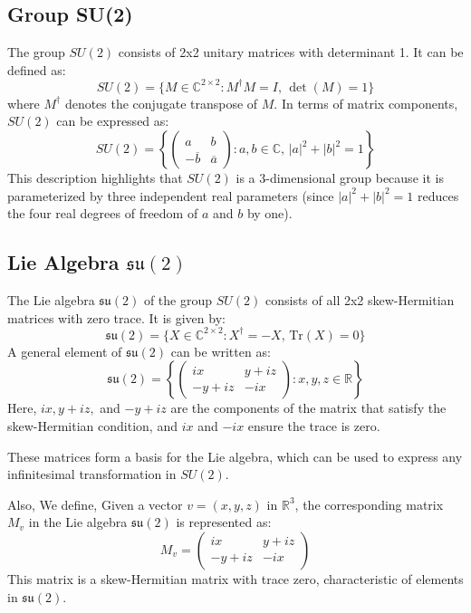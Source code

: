 \documentclass{article}
\begin{document}
\subsection*{Group SU(2)}
The group \( SU(2) \) consists of 2x2 unitary matrices with determinant 1. It can be defined as:
\[
SU(2) = \{ M \in \mathbb{C}^{2 \times 2} : M^\dagger M = I, \, \det(M) = 1 \}
\]
where \( M^\dagger \) denotes the conjugate transpose of \( M \). In terms of matrix components, \( SU(2) \) can be expressed as:
\[
SU(2) = \left\{ \begin{pmatrix} a & b \\ -\overline{b} & \overline{a} \end{pmatrix} : a, b \in \mathbb{C}, \, |a|^2 + |b|^2 = 1 \right\}
\]
This description highlights that \( SU(2) \) is a 3-dimensional group because it is parameterized by three independent real parameters (since \( |a|^2 + |b|^2 = 1 \) reduces the four real degrees of freedom of \( a \) and \( b \) by one).

\subsection*{Lie Algebra \( \mathfrak{su}(2) \)}
The Lie algebra \( \mathfrak{su}(2) \) of the group \( SU(2) \) consists of all 2x2 skew-Hermitian matrices with zero trace. It is given by:
\[
\mathfrak{su}(2) = \{ X \in \mathbb{C}^{2 \times 2} : X^\dagger = -X, \, \text{Tr}(X) = 0 \}
\]
A general element of \( \mathfrak{su}(2) \) can be written as:
\[
\mathfrak{su}(2) = \left\{ \begin{pmatrix} ix & y+iz \\ -y+iz & -ix \end{pmatrix} : x, y, z \in \mathbb{R} \right\}
\]
Here, \( ix, y+iz, \) and \( -y+iz \) are the components of the matrix that satisfy the skew-Hermitian condition, and \( ix \) and \( -ix \) ensure the trace is zero.

These matrices form a basis for the Lie algebra, which can be used to express any infinitesimal transformation in \( SU(2) \).

Also, We define, 
Given a vector \( v = (x, y, z) \) in \( \mathbb{R}^3 \), the corresponding matrix \( M_v \) in the Lie algebra \( \mathfrak{su}(2) \) is represented as:
\[
M_v = \begin{pmatrix}
ix & y + iz \\
-y + iz & -ix
\end{pmatrix}
\]
This matrix is a skew-Hermitian matrix with trace zero, characteristic of elements in \( \mathfrak{su}(2) \).
\end{document}

